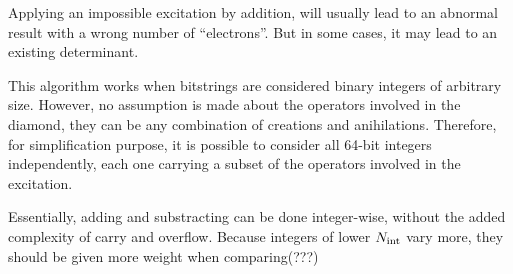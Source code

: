 \documentclass[./thesis.tex]{subfiles}
\begin{document}
\begin{algorithm}

\ForAll{$\kI$ with $EXC(\kI, \kalpha) \leq 4$}{

$\delta \gets -(I + \alpha)$ \;
$i \gets 1$ \;
$j \gets 1$ \;
\While{$j \leq N \wedge i \leq N$}{
	\uIf{$D_j - D_i > \delta$}{
		increment $i$ \;
	}
	\uElseIf{$D_j - D_i < \delta$}{
		increment $j$ \;
	}
	\Else
	{
		\tcc{$\hat T_{I \rightarrow D_j}$ is $D_j-I$}
		\tcc{$D_i + (D_j-I) = \alpha$}
		
		
		
		
		\tcc{\alert{check if addition applies correct excitaion}}
		\tcc{impossible exciation results in an abnormal number of modified spinorbitals}	
		\If{$||D_j \oplus I|| = ||D_i \oplus \alpha||$}{
			diamond found \;
		}
		increment $i$ and $j$ \;
	}
}
}
\end{algorithm}

Applying an impossible excitation by addition, will usually lead to an abnormal result with a wrong number of ``electrons''. But in some cases, it may lead to an existing determinant. 



This algorithm works when bitstrings are considered binary integers of arbitrary size. However, no assumption is made about the operators involved in the diamond, they can be any combination of creations and anihilations. Therefore, for simplification purpose, it is possible to consider all 64-bit integers independently, each one carrying a subset of the operators involved in the excitation.

Essentially, adding and substracting can be done integer-wise, without the added complexity of carry and overflow.
Because integers of lower ${N_\text{int}}$ vary more, they should be given more weight when comparing(???)



\begin{algorithm}
	
\end{algorithm}
\end{document}

